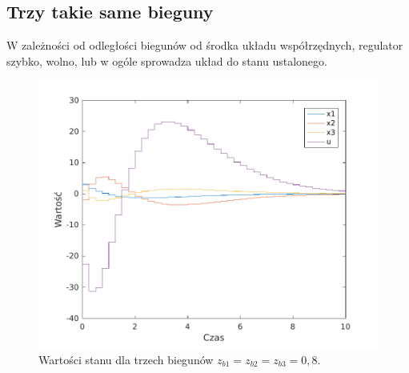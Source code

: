 \subsection{Trzy takie same bieguny}

W zależności od odległości biegunów od środka układu współrzędnych, regulator szybko, wolno, lub w ogóle sprowadza układ do stanu ustalonego.

\begin{figure}[H]
\centering
 \includegraphics[width=\textwidth]{img/plot1.pdf}
\caption{Wartości stanu dla trzech biegunów $z_{b1} = z_{b2} = z_{b3} = 0,8$.}
\end{figure}

